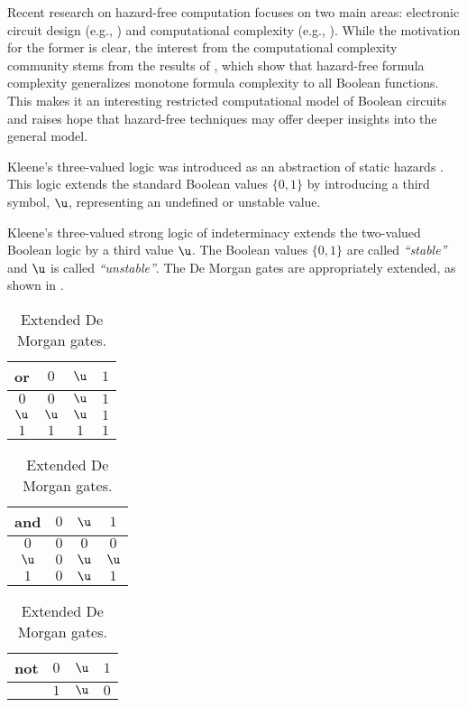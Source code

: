 \documentclass[acmsmall, nonacm, authorversion]{acmart}
\begin{document}
Recent research on hazard-free computation focuses on two main areas: electronic circuit design (e.g., \cite{FFL18, BLM20}) and computational complexity (e.g., \cite{IKL+19, KS20, Juk21, IK23}). While the motivation for the former is clear, the interest from the computational complexity community stems from the results of \cite{IKL+19}, which show that hazard-free formula complexity generalizes monotone formula complexity to all Boolean functions. This makes it an interesting restricted computational model of Boolean circuits and raises hope that hazard-free techniques may offer deeper insights into the general model.

Kleene's three-valued logic was introduced as an abstraction of static hazards \cite{yr64, Eic65}. This logic extends the standard Boolean values $\{0,1\}$ by introducing a third symbol, $\u$, representing an undefined or unstable value.

\begin{definition}\label{def:k3}
Kleene's three-valued strong logic of indeterminacy extends the two-valued Boolean logic
by a third value $\u$. The Boolean values $\{0, 1\}$ are called \emph{``stable''} and $\u$ is called \emph{``unstable''}. 
The De Morgan gates are appropriately extended, as shown in .
\end{definition}

\begin{table}[t]
\centering 
\caption{Extended De Morgan gates.}
\label{tbl:extended-gates}
\begin{tabular}[h]{c | c c c}
    or & $0$ & $\u$ & $1$ \\ 
    \hline
    $0$ & $0$ & $\u$ & $1$ \\
    $\u$ & $\u$ & $\u$ & $1$ \\
    $1$ & $1$ & $1$ & $1$ \\
\end{tabular}
\hspace{30pt}
\begin{tabular}[h]{ c | c  c  c }
    and & $0$ & $\u$ & $1$ \\ 
    \hline
    $0$ & $0$ & $0$ & $0$ \\
    $\u$ & $0$ & $\u$ & $\u$ \\
    $1$ & $0$ & $\u$ & $1$ \\
\end{tabular}
\hspace{30pt}
\begin{tabular}[h]{ c | c  c  c }
    not & $0$ & $\u$ & $1$ \\ 
    \hline
     & $1$ & $\u$ & $0$ \\
\end{tabular}
\end{table}
\end{document}
